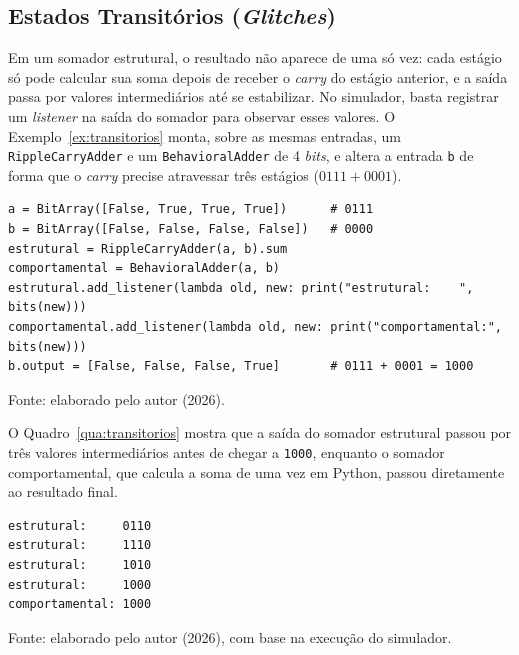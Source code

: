 \subsection{Estados Transitórios (\textit{Glitches})}

Em um somador estrutural, o resultado não aparece de uma só vez: cada estágio só pode calcular sua soma depois de receber o \textit{carry} do estágio anterior, e a saída passa por valores intermediários até se estabilizar. No simulador, basta registrar um \textit{listener} na saída do somador para observar esses valores. O Exemplo~\ref{ex:transitorios} monta, sobre as mesmas entradas, um \texttt{RippleCarryAdder} e um \texttt{BehavioralAdder} de 4 \textit{bits}, e altera a entrada \texttt{b} de forma que o \textit{carry} precise atravessar três estágios ($0111 + 0001$).

\begin{exemplo}[H]
\caption{Observação dos estados transitórios de um somador.}
\label{ex:transitorios}
\begin{verbatim}
a = BitArray([False, True, True, True])      # 0111
b = BitArray([False, False, False, False])   # 0000
estrutural = RippleCarryAdder(a, b).sum
comportamental = BehavioralAdder(a, b)
estrutural.add_listener(lambda old, new: print("estrutural:    ", bits(new)))
comportamental.add_listener(lambda old, new: print("comportamental:", bits(new)))
b.output = [False, False, False, True]       # 0111 + 0001 = 1000
\end{verbatim}
\begin{center}
\footnotesize Fonte: elaborado pelo autor (2026).
\end{center}
\end{exemplo}

O Quadro~\ref{qua:transitorios} mostra que a saída do somador estrutural passou por três valores intermediários antes de chegar a \texttt{1000}, enquanto o somador comportamental, que calcula a soma de uma vez em Python, passou diretamente ao resultado final.

\begin{quadro}[H]
\centering
\caption{Saídas observadas durante a propagação do Exemplo~\ref{ex:transitorios}.}
\label{qua:transitorios}
\begin{minipage}{0.5\textwidth}
\begin{verbatim}
estrutural:     0110
estrutural:     1110
estrutural:     1010
estrutural:     1000
comportamental: 1000
\end{verbatim}
\end{minipage}
\begin{center}
\footnotesize Fonte: elaborado pelo autor (2026), com base na execução do simulador.
\end{center}
\end{quadro}

